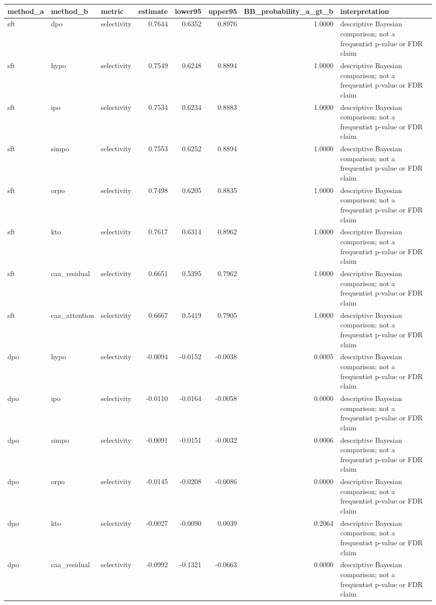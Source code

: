 \begin{tabular}{lllrrrrl}
\toprule
method\_a & method\_b & metric & estimate & lower95 & upper95 & BB\_probability\_a\_gt\_b & interpretation \\
\midrule
sft & dpo & selectivity & 0.7644 & 0.6352 & 0.8976 & 1.0000 & descriptive Bayesian comparison; not a frequentist p-value or FDR claim \\
sft & hypo & selectivity & 0.7549 & 0.6248 & 0.8894 & 1.0000 & descriptive Bayesian comparison; not a frequentist p-value or FDR claim \\
sft & ipo & selectivity & 0.7534 & 0.6234 & 0.8883 & 1.0000 & descriptive Bayesian comparison; not a frequentist p-value or FDR claim \\
sft & simpo & selectivity & 0.7553 & 0.6252 & 0.8894 & 1.0000 & descriptive Bayesian comparison; not a frequentist p-value or FDR claim \\
sft & orpo & selectivity & 0.7498 & 0.6205 & 0.8835 & 1.0000 & descriptive Bayesian comparison; not a frequentist p-value or FDR claim \\
sft & kto & selectivity & 0.7617 & 0.6314 & 0.8962 & 1.0000 & descriptive Bayesian comparison; not a frequentist p-value or FDR claim \\
sft & caa\_residual & selectivity & 0.6651 & 0.5395 & 0.7962 & 1.0000 & descriptive Bayesian comparison; not a frequentist p-value or FDR claim \\
sft & caa\_attention & selectivity & 0.6667 & 0.5419 & 0.7905 & 1.0000 & descriptive Bayesian comparison; not a frequentist p-value or FDR claim \\
dpo & hypo & selectivity & -0.0094 & -0.0152 & -0.0038 & 0.0005 & descriptive Bayesian comparison; not a frequentist p-value or FDR claim \\
dpo & ipo & selectivity & -0.0110 & -0.0164 & -0.0058 & 0.0000 & descriptive Bayesian comparison; not a frequentist p-value or FDR claim \\
dpo & simpo & selectivity & -0.0091 & -0.0151 & -0.0032 & 0.0006 & descriptive Bayesian comparison; not a frequentist p-value or FDR claim \\
dpo & orpo & selectivity & -0.0145 & -0.0208 & -0.0086 & 0.0000 & descriptive Bayesian comparison; not a frequentist p-value or FDR claim \\
dpo & kto & selectivity & -0.0027 & -0.0090 & 0.0039 & 0.2064 & descriptive Bayesian comparison; not a frequentist p-value or FDR claim \\
dpo & caa\_residual & selectivity & -0.0992 & -0.1321 & -0.0663 & 0.0000 & descriptive Bayesian comparison; not a frequentist p-value or FDR claim \\

\end{tabular}
